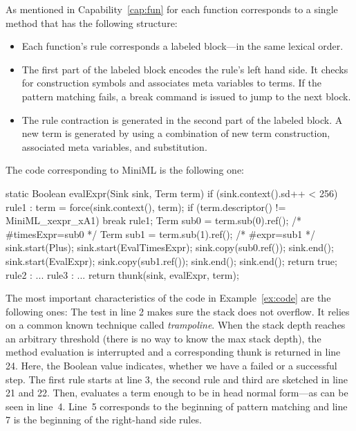 As mentioned in Capability~\ref{cap:fun} for 
each \Tosca function corresponds to a single \java method that 
has the following structure:
\begin{itemize}
\item Each \Tosca function's rule corresponds a \java labeled block---in the same lexical order.
\item The first part of the \java labeled block encodes the
  rule's left hand side. It checks for construction symbols and
  associates meta variables to terms.  If the pattern matching fails,
  a break command is issued to jump to the next \java block.
\item The rule contraction is generated in the second part of the \java labeled block. A new term is generated by 
using a combination of new term construction, associated meta variables, and substitution.
\end{itemize}
%
\begin{example} \label{ex:code}
The \java code corresponding to MiniML  is the following one:
\begin{lstTosca}
static Boolean evalExpr(Sink sink, Term term) {
  if (sink.context().sd++ < 256) 	{
			rule1 : {
				term = force(sink.context(), term);
				if (term.descriptor() != MiniML_xexpr_xA1)
					break rule1;
				Term sub0 = term.sub(0).ref();
				/* #timesExpr=sub0 */
				Term sub1 = term.sub(1).ref();
				/* #expr=sub1 */
				sink.start(Plus);
				sink.start(EvalTimesExpr);
				sink.copy(sub0.ref());
				sink.end();
				sink.start(EvalExpr);
				sink.copy(sub1.ref());
				sink.end();
				sink.end();
				return true;
			}
			rule2 : { ... }
			rule3 :	{ ... }
		}
		return thunk(sink, evalExpr, term);
	}	
\end{lstTosca}
\end{example} 
%
The most important characteristics of the \java code in
Example~\ref{ex:code} are the following ones: The test in line 2 makes
sure the stack does not overflow. It relies on a common known technique
called \emph{trampoline}. When the stack depth reaches an arbitrary
threshold (there is no way to know the \java max stack depth), the
method evaluation is interrupted and a corresponding thunk is returned
in line 24. Here, the Boolean value indicates, whether we have a failed or a successful step.
The first rule starts at line 3, the second rule and third are
sketched in line 21 and 22. Then,
 evaluates a term enough to be in head normal
form---as can be seen in line~4. Line~5 corresponds to the
beginning of pattern matching and line 7 is the beginning of the
right-hand side rules.


